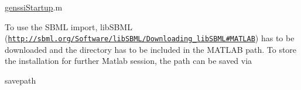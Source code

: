 \begin{DoxyCode}
\hyperlink{genssi_startup_8m_addcff165cb4278db5bc6df9f60bff280}{genssiStartup}.m 
\end{DoxyCode}


To use the S\+B\+ML import, lib\+S\+B\+ML (\href{http://sbml.org/Software/libSBML/Downloading_libSBML#MATLAB}{\tt http\+://sbml.\+org/\+Software/lib\+S\+B\+M\+L/\+Downloading\+\_\+lib\+S\+B\+M\+L\#\+M\+A\+T\+L\+AB}) has to be downloaded and the directory has to be included in the M\+A\+T\+L\+AB path. To store the installation for further Matlab session, the path can be saved via


\begin{DoxyCode}
savepath 
\end{DoxyCode}
 